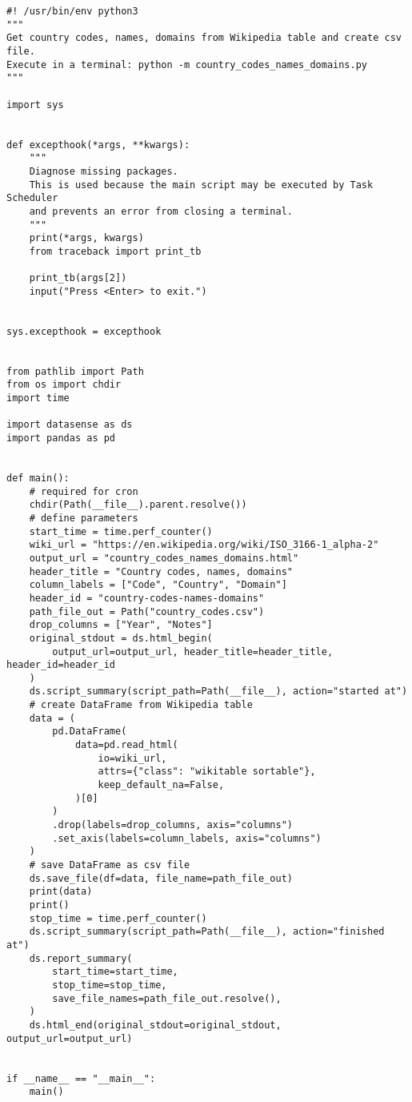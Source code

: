 \documentclass[10pt, letterpaper, twoside]{article}
\begin{document}
\begin{footnotesize}
\begin{verbatim}
#! /usr/bin/env python3
"""
Get country codes, names, domains from Wikipedia table and create csv file.
Execute in a terminal: python -m country_codes_names_domains.py
"""

import sys


def excepthook(*args, **kwargs):
    """
    Diagnose missing packages.
    This is used because the main script may be executed by Task Scheduler
    and prevents an error from closing a terminal.
    """
    print(*args, kwargs)
    from traceback import print_tb

    print_tb(args[2])
    input("Press <Enter> to exit.")


sys.excepthook = excepthook


from pathlib import Path
from os import chdir
import time

import datasense as ds
import pandas as pd


def main():
    # required for cron
    chdir(Path(__file__).parent.resolve())
    # define parameters
    start_time = time.perf_counter()
    wiki_url = "https://en.wikipedia.org/wiki/ISO_3166-1_alpha-2"
    output_url = "country_codes_names_domains.html"
    header_title = "Country codes, names, domains"
    column_labels = ["Code", "Country", "Domain"]
    header_id = "country-codes-names-domains"
    path_file_out = Path("country_codes.csv")
    drop_columns = ["Year", "Notes"]
    original_stdout = ds.html_begin(
        output_url=output_url, header_title=header_title, header_id=header_id
    )
    ds.script_summary(script_path=Path(__file__), action="started at")
    # create DataFrame from Wikipedia table
    data = (
        pd.DataFrame(
            data=pd.read_html(
                io=wiki_url,
                attrs={"class": "wikitable sortable"},
                keep_default_na=False,
            )[0]
        )
        .drop(labels=drop_columns, axis="columns")
        .set_axis(labels=column_labels, axis="columns")
    )
    # save DataFrame as csv file
    ds.save_file(df=data, file_name=path_file_out)
    print(data)
    print()
    stop_time = time.perf_counter()
    ds.script_summary(script_path=Path(__file__), action="finished at")
    ds.report_summary(
        start_time=start_time,
        stop_time=stop_time,
        save_file_names=path_file_out.resolve(),
    )
    ds.html_end(original_stdout=original_stdout, output_url=output_url)


if __name__ == "__main__":
    main()
\end{verbatim}
\end{footnotesize}
\newpage
\end{document}
